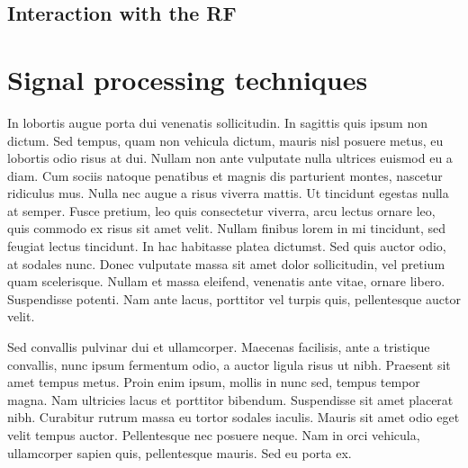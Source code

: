 \subsection[Interaction with the RF]{Interaction with the RF}

\section[Signal processing techniques]{Signal processing techniques}
In lobortis augue porta dui venenatis sollicitudin. In sagittis quis ipsum non dictum. Sed tempus, quam non vehicula dictum, mauris nisl posuere metus, eu lobortis odio risus at dui. Nullam non ante vulputate nulla ultrices euismod eu a diam. Cum sociis natoque penatibus et magnis dis parturient montes, nascetur ridiculus mus. Nulla nec augue a risus viverra mattis. Ut tincidunt egestas nulla at semper. Fusce pretium, leo quis consectetur viverra, arcu lectus ornare leo, quis commodo ex risus sit amet velit. Nullam finibus lorem in mi tincidunt, sed feugiat lectus tincidunt. In hac habitasse platea dictumst. Sed quis auctor odio, at sodales nunc. Donec vulputate massa sit amet dolor sollicitudin, vel pretium quam scelerisque. Nullam et massa eleifend, venenatis ante vitae, ornare libero. Suspendisse potenti. Nam ante lacus, porttitor vel turpis quis, pellentesque auctor velit.

Sed convallis pulvinar dui et ullamcorper. Maecenas facilisis, ante a tristique convallis, nunc ipsum fermentum odio, a auctor ligula risus ut nibh. Praesent sit amet tempus metus. Proin enim ipsum, mollis in nunc sed, tempus tempor magna. Nam ultricies lacus et porttitor bibendum. Suspendisse sit amet placerat nibh. Curabitur rutrum massa eu tortor sodales iaculis. Mauris sit amet odio eget velit tempus auctor. Pellentesque nec posuere neque. Nam in orci vehicula, ullamcorper sapien quis, pellentesque mauris. Sed eu porta ex. 
